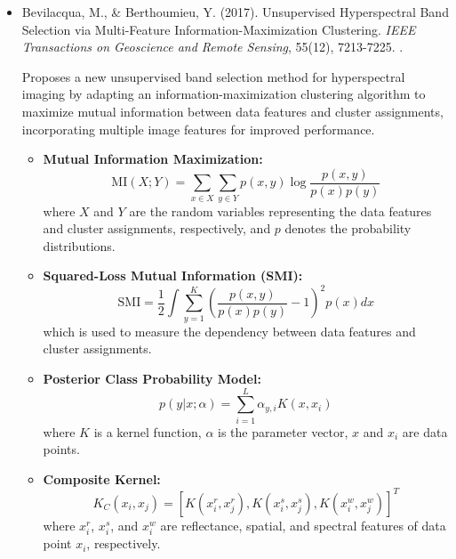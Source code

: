 \documentclass[10pt,svgnames,fragile]{beamer}
\begin{document}
\begin{frame}{}
\tiny
\begin{itemize}

    \item Bevilacqua, M., & Berthoumieu, Y. (2017). Unsupervised Hyperspectral Band Selection via Multi-Feature Information-Maximization Clustering. \textit{IEEE Transactions on Geoscience and Remote Sensing}, 55(12), 7213-7225. \href{https://doi.org/10.1109/IGARSS.2017.8127512}{\color{blue}{DOI: 10.1109/IGARSS.2017.8127512}}. \cite{bevilacquaUnsupervisedHyperspectralBand2017}
    
    {\color{gray}Proposes a new unsupervised band selection method for hyperspectral imaging by adapting an information-maximization clustering algorithm to maximize mutual information between data features and cluster assignments, incorporating multiple image features for improved performance.}
    \begin{itemize} \tiny
    \item \textbf{Mutual Information Maximization:}
    \[
    \text{MI}(X;Y) = \sum_{x \in X} \sum_{y \in Y} p(x,y) \log \frac{p(x,y)}{p(x)p(y)}
    \]
    where \( X \) and \( Y \) are the random variables representing the data features and cluster assignments, respectively, and \( p \) denotes the probability distributions.

    \item \textbf{Squared-Loss Mutual Information (SMI):}
    \[
    \text{SMI} = \frac{1}{2} \int \sum_{y=1}^{K} \left( \frac{p(x,y)}{p(x)p(y)} - 1 \right)^2 p(x) dx
    \]
    which is used to measure the dependency between data features and cluster assignments.

    \item \textbf{Posterior Class Probability Model:}
    \[
    p(y|x;\alpha) = \sum_{i=1}^{L} \alpha_{y,i} K(x,x_i)
    \]
    where \( K \) is a kernel function, \( \alpha \) is the parameter vector, \( x \) and \( x_i \) are data points.

    \item \textbf{Composite Kernel:}
    \[
    K_C(x_i, x_j) = \left[ K(x_i^r, x_j^r), K(x_i^s, x_j^s), K(x_i^w, x_j^w) \right]^T
    \]
    where \( x_i^r \), \( x_i^s \), and \( x_i^w \) are reflectance, spatial, and spectral features of data point \( x_i \), respectively.
    \end{itemize}
    
\end{itemize}
\end{frame}
\end{document}
